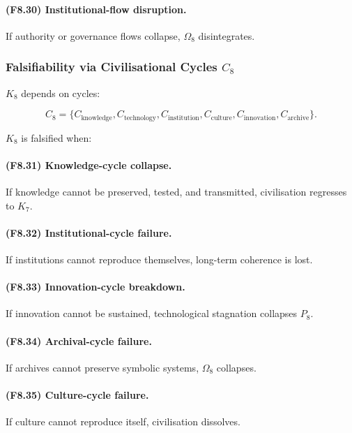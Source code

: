 \paragraph{(F8.30) Institutional-flow disruption.}
If authority or governance flows collapse,
$\Omega_8$ disintegrates.



\subsubsection{Falsifiability via Civilisational Cycles \texorpdfstring{$C_8$}{C_8}}

$K_8$ depends on cycles:

\[
C_8 = \{
C_{\mathrm{knowledge}},
C_{\mathrm{technology}},
C_{\mathrm{institution}},
C_{\mathrm{culture}},
C_{\mathrm{innovation}},
C_{\mathrm{archive}}
\}.
\]

$K_8$ is falsified when:

\paragraph{(F8.31) Knowledge-cycle collapse.}
If knowledge cannot be preserved, tested, and transmitted,
civilisation regresses to $K_7$.

\paragraph{(F8.32) Institutional-cycle failure.}
If institutions cannot reproduce themselves,
long-term coherence is lost.

\paragraph{(F8.33) Innovation-cycle breakdown.}
If innovation cannot be sustained,
technological stagnation collapses $P_8$.

\paragraph{(F8.34) Archival-cycle failure.}
If archives cannot preserve symbolic systems,
$\Omega_8$ collapses.

\paragraph{(F8.35) Culture-cycle failure.}
If culture cannot reproduce itself,
civilisation dissolves.



